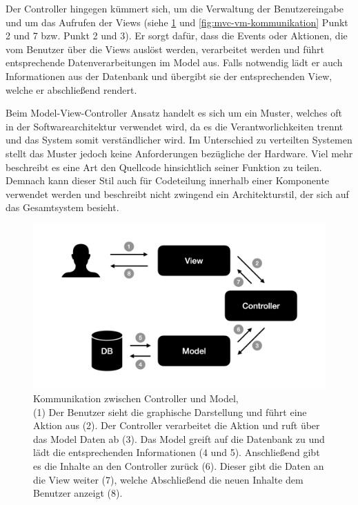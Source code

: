 Der Controller hingegen kümmert sich, um die Verwaltung der Benutzereingabe und um das Aufrufen der Views (siehe \cref{fig:mvc-cm-kommunikation} und \cref{fig:mvc-vm-kommunikation} Punkt 2 und 7 bzw. Punkt 2 und 3). Er sorgt dafür, dass die Events oder Aktionen, die vom Benutzer über die Views auslöst werden, verarbeitet werden und führt entsprechende Datenverarbeitungen im Model aus. Falls notwendig lädt er auch Informationen aus der Datenbank und übergibt sie der entsprechenden View, welche er abschließend rendert.

Beim Model-View-Controller Ansatz handelt es sich um ein Muster, welches oft in der Softwarearchitektur verwendet wird, da es die Verantworlichkeiten trennt und das System somit verständlicher wird.
Im Unterschied zu verteilten Systemen stellt das Muster jedoch keine Anforderungen bezügliche der Hardware. Viel mehr beschreibt es eine Art den Quellcode hinsichtlich seiner Funktion zu teilen. Demnach kann dieser Stil auch für Codeteilung innerhalb einer Komponente verwendet werden und beschreibt nicht zwingend ein Architekturstil, der sich auf das Gesamtsystem besieht.

\begin{figure}
	\centering
	\includegraphics[width=.6\textwidth]{Assets/Interaktionsorientiert.001}
	\caption[Kommunikation zwischen Controller und Model]{Kommunikation zwischen Controller und Model, \\ (1) Der Benutzer sieht die graphische Darstellung und führt eine Aktion aus (2). Der Controller verarbeitet die Aktion und ruft über das Model Daten ab (3). Das Model greift auf die Datenbank zu und lädt die entsprechenden Informationen (4 und 5). Anschließend gibt es die Inhalte an den Controller zurück (6). Dieser gibt die Daten an die View weiter (7), welche Abschließend die neuen Inhalte dem Benutzer anzeigt (8).}
	\label{fig:mvc-cm-kommunikation}
 \end{figure}
 
